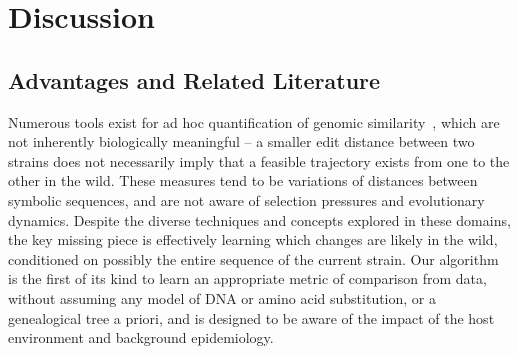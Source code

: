 \documentclass[onecolumn, compsoc,10pt]{IEEEtran}
\begin{document}
\section*{Discussion}

\subsection*{\enet Advantages and Related Literature}

Numerous tools exist for ad hoc quantification of genomic similarity~\cite{posada1998modeltest,goldberger2005genomic,huelsenbeck1997phylogeny,neher2014predicting,VanderMeer2010,Smith2009}, which are not inherently biologically meaningful -- a smaller edit distance between two strains does not necessarily imply that a feasible trajectory exists from one to the other in the wild. These measures tend to be  variations of distances between symbolic sequences, and are not aware of selection pressures and evolutionary dynamics. Despite the diverse techniques and concepts explored in these domains, the key missing piece is effectively learning which changes are likely in the wild, conditioned on possibly the entire sequence of the current strain. Our algorithm is the first of its kind to learn an appropriate metric of comparison from data, without assuming any model of DNA or amino acid substitution, or a genealogical tree a priori, and is  designed to be aware of the impact of the  host environment and background epidemiology.
\end{document}
